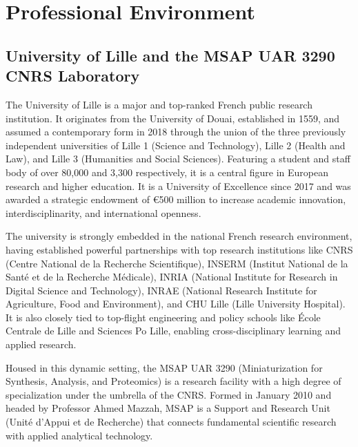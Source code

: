 \documentclass[12pt,a4paper]{report}
\begin{document}
\tableofcontents
\newpage



\chapter{Professional Environment}

\section{University of Lille and the MSAP UAR 3290 CNRS Laboratory}

The University of Lille is a major and top-ranked French public research institution. It
originates from the University of Douai, established in 1559, and assumed a contemporary form in 2018 through the union of the three previously independent universities of Lille 1 (Science and Technology), Lille 2 (Health and Law), and Lille 3 (Humanities and Social Sciences). Featuring a student and staff body of over 80,000 and 3,300 respectively, it is a central figure in European research and higher education. It is a University of Excellence since 2017 and was awarded a strategic endowment of €500 million to increase academic innovation, interdisciplinarity, and international openness.

The university is strongly embedded in the national French research environment, having established powerful partnerships with top research institutions like CNRS (Centre National de la Recherche Scientifique), INSERM (Institut National de la Santé et de la Recherche Médicale), INRIA (National Institute for Research in Digital Science and Technology), INRAE (National Research Institute for Agriculture, Food and Environment), and CHU Lille (Lille University Hospital). It is also closely tied to top-flight engineering and policy schools like École Centrale de Lille and Sciences Po Lille, enabling cross-disciplinary learning and applied research.


Housed in this dynamic setting, the MSAP UAR 3290 (Miniaturization for Synthesis, Analysis, and Proteomics) is a research facility with a high degree of specialization under the umbrella of the CNRS. Formed in January 2010 and headed by Professor Ahmed Mazzah, MSAP is a Support and Research Unit (Unité d’Appui et de Recherche) that connects fundamental scientific research with applied analytical technology.
\end{document}

